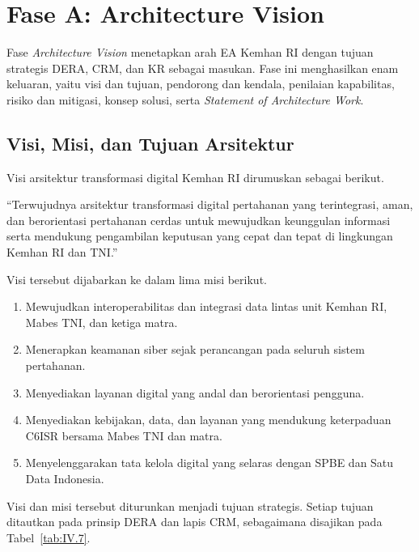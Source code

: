 \section{Fase A: Architecture Vision}
\label{sec:IV.3}

Fase \textit{Architecture Vision} menetapkan arah EA Kemhan RI dengan tujuan strategis DERA, CRM, dan KR sebagai masukan. Fase ini menghasilkan enam keluaran, yaitu visi dan tujuan, pendorong dan kendala, penilaian kapabilitas, risiko dan mitigasi, konsep solusi, serta \textit{Statement of Architecture Work}.

\subsection{Visi, Misi, dan Tujuan Arsitektur}
\label{sec:IV.3.1}

Visi arsitektur transformasi digital Kemhan RI dirumuskan sebagai berikut.

“Terwujudnya arsitektur transformasi digital pertahanan yang terintegrasi, aman, dan berorientasi pertahanan cerdas untuk mewujudkan keunggulan informasi serta mendukung pengambilan keputusan yang cepat dan tepat di lingkungan Kemhan RI dan TNI.”

Visi tersebut dijabarkan ke dalam lima misi berikut.

\begin{enumerate}[label=\arabic*.]
\item Mewujudkan interoperabilitas dan integrasi data lintas unit Kemhan RI, Mabes TNI, dan ketiga matra.
\item Menerapkan keamanan siber sejak perancangan pada seluruh sistem pertahanan.
\item Menyediakan layanan digital yang andal dan berorientasi pengguna.
\item Menyediakan kebijakan, data, dan layanan yang mendukung keterpaduan C6ISR bersama Mabes TNI dan matra.
\item Menyelenggarakan tata kelola digital yang selaras dengan SPBE dan Satu Data Indonesia.
\end{enumerate}

Visi dan misi tersebut diturunkan menjadi tujuan strategis. Setiap tujuan ditautkan pada prinsip DERA dan lapis CRM, sebagaimana disajikan pada Tabel~\ref{tab:IV.7}.

